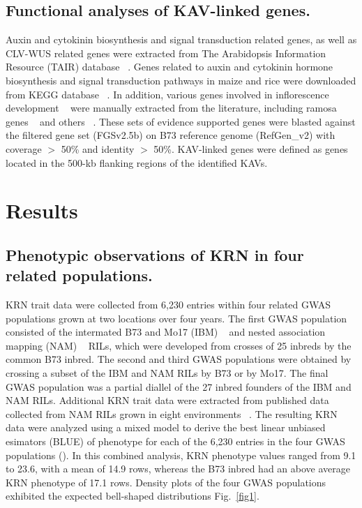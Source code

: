 \documentclass[10pt,letterpaper]{article}
\begin{document}
\subsection*{Functional analyses of KAV-linked genes.} 
Auxin and cytokinin biosynthesis and signal transduction related genes, as well as CLV-WUS related genes were extracted from The Arabidopsis Information Resource (TAIR) database ~\cite{Poole2007}. Genes related to auxin and cytokinin hormone biosynthesis and signal transduction pathways in maize and rice were downloaded from KEGG database ~\cite{Kanehisa2002}. In addition, various genes involved in inflorescence development ~\cite{Barazesh2008} were manually extracted from the literature, including ramosa genes ~\cite{Bortiri2006} and others ~\cite{McSteen2001, Upadyayula2006, Xu2011}. These sets of evidence supported genes were blasted against the filtered gene set (FGSv2.5b) on B73 reference genome (RefGen\_v2) with coverage $>$ 50\% and identity $>$ 50\%. KAV-linked genes were defined as genes located in the 500-kb flanking regions of the identified KAVs.


\section*{Results}
\subsection*{Phenotypic observations of KRN in four related populations.}

KRN trait data were collected from 6,230 entries within four related GWAS populations grown at two locations over four years. The first GWAS population consisted of the intermated B73 and Mo17 (IBM) ~\cite{Lee2002} and nested association mapping (NAM) ~\cite{Yu2008} RILs, which were developed from crosses of 25 inbreds by the common B73 inbred. The second and third GWAS populations were obtained by crossing a subset of the IBM and NAM RILs by B73 or by Mo17.  The final GWAS population was a partial diallel of the 27 inbred founders of the IBM and NAM RILs. Additional KRN trait data were extracted from published data collected from NAM RILs grown in eight environments ~\cite{Brown2011}. The resulting KRN data were analyzed using a mixed model to derive the best linear unbiased esimators (BLUE) of phenotype for each of the 6,230 entries in the four GWAS populations (). In this combined analysis, KRN phenotype values ranged from 9.1 to 23.6, with a mean of 14.9 rows, whereas the B73 inbred had an above average KRN phenotype of 17.1 rows. Density plots of the four GWAS populations exhibited the expected bell-shaped distributions Fig.~\ref{fig1}.
\end{document}
